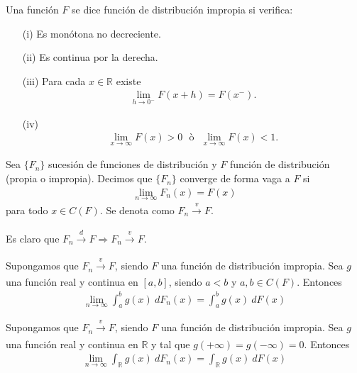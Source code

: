 \begin{defi}
    Una función $F$ se dice función de distribución impropia si verifica:
    \begin{enumerate}
        \item[(i)] Es monótona no decreciente.
        \item[(ii)] Es continua por la derecha.
        \item[(iii)] Para cada $x \in \mathbb{R}$ existe
              \begin{align*}
                  \lim_{h \to 0^-} F(x+h) = F(x^-).
              \end{align*}
        \item[(iv)]
              \begin{align*}
                  \lim_{x \to \infty} F(x) > 0 \ \ \ \text{ò} \ \ \ \lim_{x \to \infty} F(x) < 1.
              \end{align*}
    \end{enumerate}
\end{defi}

\begin{defi}
    Sea $\{F_n\}$ sucesión de funciones de distribución y $F$ función de distribución (propia o impropia). Decimos que $\{F_n\}$ converge de forma vaga a $F$ si
    \begin{align*}
        \lim_{n \to \infty} F_n(x) = F(x)
    \end{align*}
    para todo $x \in C(F)$. Se denota como $F_n \xrightarrow[]{v} F$.
\end{defi}

\begin{obs}
    Es claro que $F_n \xrightarrow[]{d} F \Longrightarrow F_n \xrightarrow[]{v} F$.
\end{obs}

\begin{teo}
    Supongamos que $F_n \xrightarrow[]{v} F$, siendo $F$ una función de distribución impropia. Sea $g$ una función real y continua en $[a,b]$, siendo $a<b$ y $a,b \in C(F)$. Entonces
    \begin{align*}
        \lim_{n \to \infty} \int_{a}^{b} g(x) \ dF_n(x) = \int_{a}^{b} g(x) \ dF(x)
    \end{align*}
\end{teo}

\begin{teo}
    Supongamos que $F_n \xrightarrow[]{v} F$, siendo $F$ una función de distribución impropia. Sea $g$ una función real y continua en $\mathbb{R}$ y tal que $g(+\infty) = g(-\infty) = 0$. Entonces
    \begin{align*}
        \lim_{n \to \infty} \int_{\mathbb{R}} g(x) \ dF_n(x) = \int_{\mathbb{R}} g(x) \ dF(x)
    \end{align*}
\end{teo}

